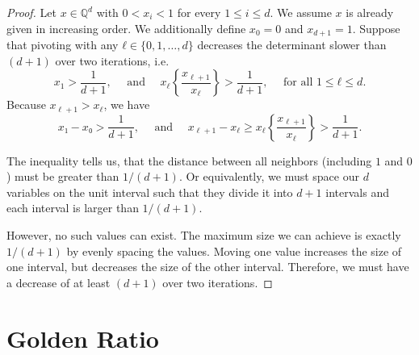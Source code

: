 \begin{proof}
  Let $x ∈ ℚ^d$ with $0 < x_i < 1$ for every $1 ≤ i ≤ d$.
  We assume $x$ is already given in increasing order.
  We additionally define $x_0 = 0$ and $x_{d+1} = 1$.
  Suppose that pivoting with any $ℓ ∈ \{0, 1, \dots, d\}$
  decreases the determinant slower than $(d+1)$ over two iterations,
  i.e.
  \[
    x_1 > \frac{1}{d+1},
    \quad \text{ and } \quad
    x_\ell \left\{\frac{x_{\ell+1}}{x_\ell}\right\} > \frac{1}{d+1}, \quad \text{ for all } 1 ≤ ℓ ≤ d.
  \]
  Because $x_{\ell+1} > x_\ell$, we have
  \[
    x₁ - x₀ > \frac{1}{d+1},
    \quad \text{ and } \quad
    x_{\ell+1} - x_\ell ≥ x_\ell \left\{\frac{x_{\ell+1}}{x_\ell}\right\} > \frac{1}{d+1}.
  \]

  The inequality tells us, that the distance between all neighbors
  (including $1$ and $0$) must be greater than $1/(d+1)$.
  Or equivalently, we must space our $d$ variables on the unit interval such that they
  divide it into $d+1$ intervals and each interval is larger than $1/(d+1)$.

  {\begin{center}
  \end{center}}

  However, no such values can exist.
  The maximum size we can achieve is exactly $1/(d+1)$ by evenly
  spacing the values.
  Moving one value increases the size of one interval, but decreases the size
  of the other interval.
  Therefore, we must have a decrease of at least $(d+1)$ over two iterations.
\end{proof}

\section{Golden Ratio}

